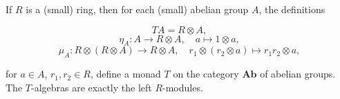 If $R$ is a (small) ring, then for each (small) abelian group $A$, the definitions

$$TA = R \otimes A,$$
$$\eta_A : A \to R \otimes A, \quad a \mapsto 1 \otimes a,$$
$$\mu_A : R \otimes (R \otimes A) \to R \otimes A, \quad r_1 \otimes (r_2 \otimes a) \mapsto r_1 r_2 \otimes a,$$

for $a \in A$, $r_1, r_2 \in R$, define a monad $T$ on the category $\mathbf{Ab}$ of abelian groups. The $T$-algebras are exactly the left $R$-modules.
